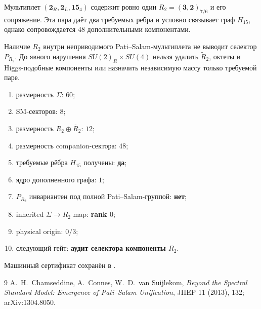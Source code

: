 \begin{theorem}
Мультиплет $(\mathbf2_R,\mathbf2_L,\mathbf{15}_4)$ содержит ровно один
$R_2=(\mathbf3,\mathbf2)_{7/6}$ и его сопряжение. Эта пара даёт два
требуемых ребра и условно связывает граф $H_{15}$, однако сопровождается
48 дополнительными компонентами.
\end{theorem}

\begin{nogocriterion}
Наличие $R_2$ внутри неприводимого Pati--Salam-мультиплета не выводит
селектор $P_{R_2}$. До явного нарушения $SU(2)_R\times SU(4)$ нельзя
удалить $\widetilde R_2$, октеты и Higgs-подобные компоненты или назначить
независимую массу только требуемой паре.
\end{nogocriterion}

\begin{protocol}\begin{enumerate}
\item размерность $\Sigma$: \textbf{$60$};
\item SM-секторов: \textbf{$8$};
\item размерность $R_2\oplus\overline R_2$: \textbf{$12$};
\item размерность companion-сектора: \textbf{$48$};
\item требуемые рёбра $H_{15}$ получены: \textbf{да};
\item ядро дополненного графа: \textbf{$1$};
\item $P_{R_2}$ инвариантен под полной Pati--Salam-группой: \textbf{нет};
\item inherited $\Sigma\to R_2$ map: \textbf{rank $0$};
\item physical origin: \textbf{$0/3$};
\item следующий гейт: \textbf{аудит селектора компоненты $R_2$}.
\end{enumerate}\end{protocol}

Машинный сертификат сохранён в
.

\begin{thebibliography}{9}
A.~H.~Chamseddine, A.~Connes, W.~D.~van Suijlekom,
\emph{Beyond the Spectral Standard Model: Emergence of Pati--Salam Unification},
JHEP 11 (2013), 132; arXiv:1304.8050.
\end{thebibliography}